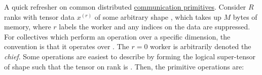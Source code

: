 A quick refresher on common distributed
\href{https://docs.nvidia.com/deeplearning/nccl/user-guide/docs/usage/collectives.html}{communication
    primitives}.  Consider $ R $ ranks with tensor data $ x ^{ (r) }  $ of some arbitrary shape
    , which takes up $ M $ bytes of memory, where $ r $ labels the worker and any
    indices on the data are suppressed. For collectives which perform an operation over a specific
    dimension, the  convention is that it operates over . The $ r=0
    $ worker is arbitrarily denoted the \textit{chief}. Some operations are easiest to describe by
    forming the logical super-tensor  of shape
     such that the tensor on rank  is .
    Then, the primitive operations are:
